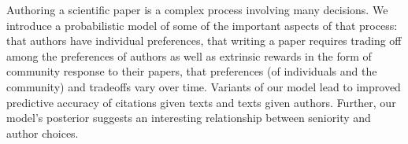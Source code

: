Authoring a scientific paper is a complex process involving many decisions. We introduce a probabilistic model of some of the important aspects of that process: that authors have individual preferences, that writing a paper requires trading off among the preferences of authors as well as extrinsic rewards in the form of community response to their papers, that preferences (of individuals and the community) and tradeoffs vary over time. Variants of our model lead to improved predictive accuracy of citations given texts and texts given authors. Further, our model's posterior suggests an interesting relationship between seniority and author choices.
